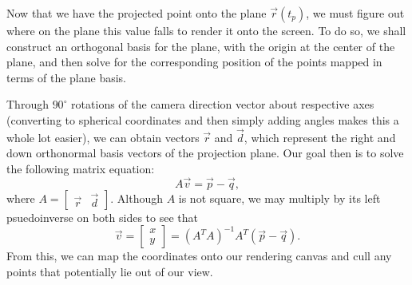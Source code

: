 \documentclass[a4paper, 12pt]{article}
\begin{document}
Now that we have the projected point onto the plane \( \vec{r} (t_p) \), we must figure out where on the plane this value falls to render it onto the screen. To do so, we shall construct an orthogonal basis for the plane, with the origin at the center of the plane, and then solve for the corresponding position of the points mapped in terms of the plane basis.

Through \( 90^\circ \) rotations of the camera direction vector about respective axes (converting to spherical coordinates and then simply adding angles makes this a whole lot easier), we can obtain vectors \( \vec{r} \) and \( \vec{d} \), which represent the right and down orthonormal basis vectors of the projection plane. Our goal then is to solve the following matrix equation:
\[
    A \vec{v} = \vec{p} - \vec{q}
,\]
where \( A = \begin{bmatrix} \vec{r} & \vec{d} \end{bmatrix} \). Although \( A \) is not square, we may multiply by its left psuedoinverse on both sides to see that
\[
    \vec{v} = \begin{bmatrix} x \\ y \end{bmatrix} = (A^T A)^{-1} A^T (\vec{p} - \vec{q})
.\]
From this, we can map the coordinates onto our rendering canvas and cull any points that potentially lie out of our view.
\end{document}
